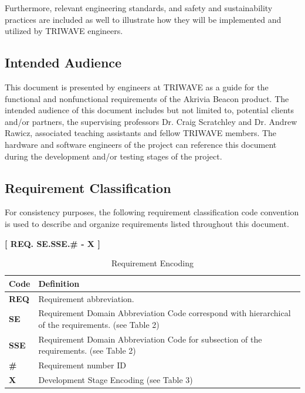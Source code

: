 Furthermore, relevant engineering standards, and safety and sustainability practices are included as well to illustrate how they will be implemented and utilized by TRIWAVE engineers.
\medskip
\medskip
\subsection{Intended Audience}
This document is presented by engineers at TRIWAVE as a guide for the functional and nonfunctional requirements of the Akrivia Beacon product. The intended audience of this document includes but not limited to, potential clients and/or partners, the supervising professors Dr. Craig Scratchley and Dr. Andrew Rawicz, associated teaching assistants and fellow TRIWAVE members. The hardware and software engineers of the project can reference this document during the development and/or testing stages of the project.
\break



\subsection{Requirement Classification}
\bigskip
For consistency purposes, the following requirement classification code convention is used to describe and organize requirements listed throughout this document. 
\begin{center}
\bigskip
	\textbf{[ REQ. SE.SSE.\# - X ]} 
\end{center}

\bgroup
\def\arraystretch{1.5}
\begin{table}[H]
\centering
\begin{tabular}{ | m{1cm} | m{13cm}| } 
\hline
\textbf{Code} & \textbf{Definition} \\ 
\hline
 \textbf{REQ} & Requirement abbreviation.  \\ 
\hline
 \textbf{SE} & Requirement Domain Abbreviation Code correspond with hierarchical of the requirements. (see Table 2)\\ 
\hline
 \textbf{SSE} & Requirement Domain Abbreviation Code for subsection of the requirements. (see Table 2) \\  
\hline
 \textbf{\#} & Requirement number ID \\ 
\hline
 \textbf{X} & Development Stage Encoding (see Table 3)\\ 
\hline
\end{tabular}
\caption{Requirement Encoding}
\end{table}

